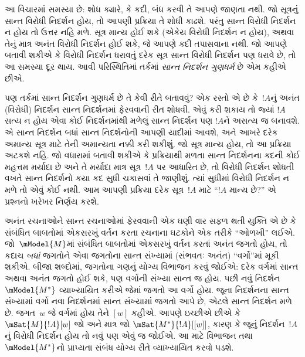 આ વિચારમાં સમસ્યા છે: શોધ ક્યારે, કે કદી, બંધ કરવી તે આપણે જાણતા
નથી. જો સૂત્રનું સાન્ત વિરોધી નિદર્શન હોય, તો આપણી પ્રક્રિયા
તે શોધી કાઢશે. પરંતુ સાન્ત વિરોધી નિદર્શન ન હોય તો ઉત્તર નહિ મળે.
સૂત્ર માન્ય હોઈ શકે (એકેય વિરોધી નિદર્શન ન હોય), અથવા તેનું
માત્ર અનંત વિરોધી નિદર્શન હોઈ શકે, જે આપણે કદી તપાસવાના નથી.
જો આપણે બતાવી શકીએ કે વિરોધી નિદર્શન ધરાવતું દરેક સૂત્ર
સાન્ત વિરોધી નિદર્શન પણ ધરાવે છે, તો આ સમસ્યા દૂર થાય. આવી
પરિસ્થિતિમાં તર્કમાં \emph{સાન્ત નિદર્શન ગુણધર્મ} છે એમ કહીએ છીએ.

પણ તર્કમાં સાન્ત નિદર્શન ગુણધર્મ છે તે કેવી રીતે બતાવવું? એક રસ્તો
એ છે કે~$!A$નું અનંત (વિરોધી) નિદર્શન સાન્ત નિદર્શનમાં ફેરવવાની
રીત શોધવી. એવું કરી શકાય તો જ્યાં $!A$ સત્ય ન હોય એવા કોઈ
નિદર્શનમાંથી મળેલું સાન્ત નિદર્શન પણ $!A$ને અસત્ય જ બનાવશે.
એ સાન્ત નિદર્શન બધાં સાન્ત નિદર્શનોની આપણી યાદીમાં આવશે, અને
આખરે દરેક અમાન્ય સૂત્ર માટે તેની અમાન્યતા નક્કી કરી શકીશું.
જો સૂત્ર માન્ય હોય, તો આ પ્રક્રિયા અટકશે નહિ. જો વધારામાં બતાવી
શકીએ કે પ્રક્રિયાથી મળતા સાન્ત નિદર્શનના કદની કોઈ મહત્તમ મર્યાદા
છે અને તે મર્યાદા માત્ર સૂત્ર~$!A$ પર આધારિત છે, તો
વિરોધી નિદર્શન શોધતી વખતે સાન્ત નિદર્શનો કયા કદ સુધી ચકાસવાં
તે જાણીશું. ત્યાં સુધીમાં વિરોધી નિદર્શન ન મળે તો એવું કોઈ
નથી. આમ આપણી પ્રક્રિયા દરેક સૂત્ર~$!A$ માટે ``$!A$ માન્ય
છે?'' એ પ્રશ્નનો ખરેખર નિર્ણય કરશે.

અનંત રચનાઓને સાન્ત રચનાઓમાં ફેરવવાની એક ઘણી વાર સફળ થતી
યુક્તિ એ છે કે સંબંધિત બાબતોમાં એકસરખું વર્તન કરતા રચનાના
ઘટકોને એક તરીકે ``ઓળખી'' લઈએ. જો~$\mModel{M}$માં
સંબંધિત બાબતોમાં એકસરખું વર્તન કરતાં અનંત જગતો હોય, તો કદાચ
\emph{બધાં} જગતોને એવા જગતોના સાન્ત સંખ્યામાં (સંભવતઃ અનંત)
``વર્ગો''માં મૂકી શકીએ. બીજા શબ્દોમાં, જગતોના ગણનું યોગ્ય
વિભાજન કરવું જોઈએ: દરેક વર્ગમાં સાન્ત અથવા અનંત જગતો હોઈ શકે,
પણ વર્ગોની સંખ્યા સાન્ત જ હોય.
પછી નવું નિદર્શન~$\mModel{M^*}$ વ્યાખ્યાયિત કરીએ જેમાં જગતો
આ વર્ગો હોય. જૂના નિદર્શનના સાન્ત સંખ્યામાં વર્ગો નવા નિદર્શનમાં
સાન્ત સંખ્યામાં જગતો આપે છે, એટલે સાન્ત નિદર્શન મળે છે.
જગત~$w$ જે વર્ગમાં હોય તેને $[w]$ કહીએ. આપણે ઇચ્છીએ છીએ કે
$\mSat{M}{!A}[w]$ જો અને માત્ર જો $\mSat{M^*}{!A}[{[w]}]$,
કારણ કે જૂનું નિદર્શન~$!A$નું વિરોધી નિદર્શન હોય તો નવું પણ
એવું જ જોઈએ. આ માટે વિભાજન તથા~$\mModel{M^*}$નો પ્રાપ્યતા
સંબંધ યોગ્ય રીતે વ્યાખ્યાયિત કરવો પડશે.

